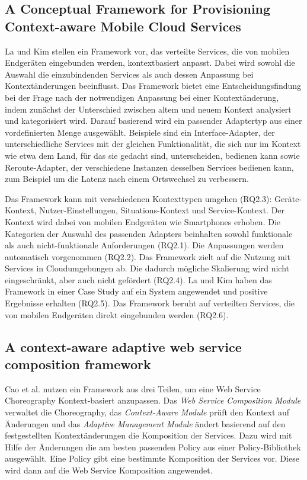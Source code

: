 \documentclass[conference,compsoc,ngerman]{IEEEtran}
\begin{document}
\subsection{A Conceptual Framework for Provisioning Context-aware Mobile Cloud Services}
La und Kim \cite{LK10} stellen ein Framework vor, das verteilte Services, die von mobilen Endgeräten eingebunden werden, kontextbasiert anpasst. Dabei wird sowohl die Auswahl die einzubindenden Services als auch dessen Anpassung bei Kontextänderungen beeinflusst. Das Framework bietet eine Entscheidungsfindung bei der Frage nach der notwendigen Anpassung bei einer Kontextänderung, indem zunächst der Unterschied zwischen altem und neuem Kontext analysiert und kategorisiert wird. Darauf basierend wird ein passender Adaptertyp aus einer vordefinierten Menge ausgewählt. Beispiele sind ein Interface-Adapter, der unterschiedliche Services mit der gleichen Funktionalität, die sich nur im Kontext wie etwa dem Land, für das sie gedacht sind, unterscheiden, bedienen kann sowie Reroute-Adapter, der verschiedene Instanzen desselben Services bedienen kann, zum Beispiel um die Latenz nach einem Ortswechsel zu verbessern.

Das Framework kann mit verschiedenen Kontexttypen umgehen (RQ2.3): Geräte-Kontext, Nutzer-Einstellungen, Situations-Kontext und Service-Kontext. Der Kontext wird dabei von mobilen Endgeräten wie Smartphones erhoben. Die Kategorien der Auswahl des passenden Adapters beinhalten sowohl funktionale als auch nicht-funktionale Anforderungen (RQ2.1). Die Anpassungen werden automatisch vorgenommen (RQ2.2). Das Framework zielt auf die Nutzung mit Services in Cloudumgebungen ab. Die dadurch mögliche Skalierung wird nicht eingeschränkt, aber auch nicht gefördert (RQ2.4). La und Kim \cite{LK10} haben das Framework in einer Case Study auf ein System angewendet und positive Ergebnisse erhalten (RQ2.5). Das Framework beruht auf verteilten Services, die von mobilen Endgeräten direkt eingebunden werden (RQ2.6).

\subsection{A context-aware adaptive web service composition framework}
Cao et al. \cite{CZZ15} nutzen ein Framework aus drei Teilen, um eine Web Service Choreography Kontext-basiert anzupassen. Das \textit{Web Service Composition Module} verwaltet die Choreography, das \textit{Context-Aware Module} prüft den Kontext auf Änderungen und das \textit{Adaptive Management Module} ändert basierend auf den festgestellten Kontextänderungen die Komposition der Services. Dazu wird mit Hilfe der Änderungen die am besten passenden Policy aus einer Policy-Bibliothek ausgewählt. Eine Policy gibt eine bestimmte Komposition der Services vor. Diese wird dann auf die Web Service Komposition angewendet.
\end{document}

